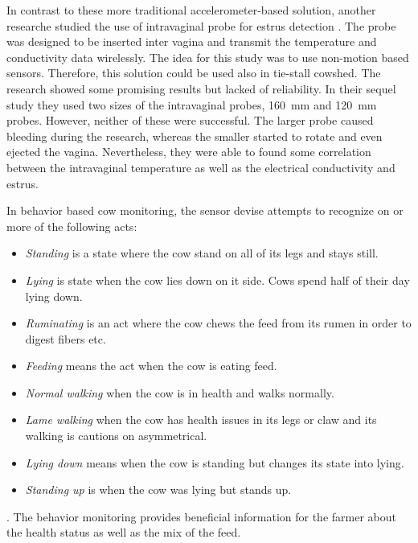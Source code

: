\documentclass[english,12pt,a4paper,pdftex,elec,utf8]{aaltothesis}
\begin{document}
In contrast to these more traditional accelerometer-based solution,  another researche studied the use of intravaginal probe for estrus detection \cite{Andersson2016101} \cite{7370219}. The probe was designed to be inserted inter vagina and transmit the temperature and conductivity data wirelessly. The idea for this study was to use non-motion based sensors. Therefore, this solution could be used  also in tie-stall cowshed. The research showed some promising results but lacked of reliability. In their sequel study they used two sizes of the intravaginal probes, \SI{160}{\milli \metre} and \SI{120}{\milli \metre} probes. However, neither of these were successful. The larger probe caused bleeding during the research, whereas the smaller started to rotate and even ejected the vagina. Nevertheless, they were able to found some correlation between the intravaginal temperature as well as the electrical conductivity and estrus.





In behavior based cow monitoring, the sensor devise attempts to recognize on or more of the following acts:

\begin{itemize}
\item \textit{Standing} is a state where the cow stand on all of its legs and stays still.
\item \textit{Lying} is state when the cow lies down on it side. Cows spend half of their day lying down.
\item \textit{Ruminating} is an act where the cow chews the feed from its rumen in order to digest fibers etc.
\item \textit{Feeding} means the act when the cow is eating feed.
\item \textit{Normal walking} when the cow is in health and walks normally.
\item \textit{Lame walking} when the cow has health issues in its legs or claw and its walking is cautions on asymmetrical.
\item \textit{Lying down} means when the cow is standing but changes its state into lying.
\item \textit{Standing up} is when the cow was lying but stands up.
\end{itemize}. The behavior monitoring provides beneficial information for the farmer about the health status as well as the mix of the feed.


\clearpage

\end{document}
